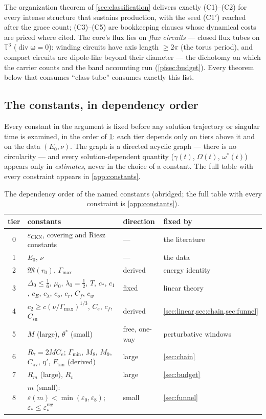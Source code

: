 \documentclass[11pt,letterpaper]{amsart}
\theoremstyle{definition}
\theoremstyle{remark}
\newcommand{\TT}{\mathbb{T}}
\newcommand{\om}{\omega}
\newcommand{\vort}{\boldsymbol{\omega}}
\newcommand{\dive}{\operatorname{div}}
\begin{document}
The organization theorem of \cref{sec:classification} delivers exactly (C1)--(C2)
for every intense structure that sustains production, with the seed (C1$'$)
reached after the grace count; (C3)--(C5) are bookkeeping clauses whose dynamical
costs are priced where cited. The core's flux lies on \emph{flux circuits} ---
closed flux tubes on $\TT^3$ ($\dive\vort=0$): winding circuits have axis length
$\ge2\pi$ (the torus period), and compact circuits are dipole-like beyond their
diameter --- the dichotomy on which the carrier counts and the band accounting
run (\cref{pfsec:budget}). Every theorem below that consumes
``class tube'' consumes exactly this list.

\subsection{The constants, in dependency order}\label{subsec:constants}
Every constant in the argument is fixed before any solution trajectory or singular
time is examined, in the order of \cref{tab:constants}: each tier depends only on
tiers above it and on the data $(E_0,\nu)$. The graph is a directed acyclic graph ---
there is no circularity --- and every solution-dependent quantity
($\gamma(t)$, $\Omega(t)$, $\om^*(t)$) appears only in \emph{estimates}, never in the
choice of a constant. The full table with every constraint appears in
\cref{app:constants}.

\begin{table}[ht]
\centering\small
\begin{tabular}{@{}clll@{}}
\toprule
tier & constants & direction & fixed by \\
\midrule
0 & $\varepsilon_{\mathrm{CKN}}$, covering and Riesz constants & --- & the literature \\
1 & $E_0$, $\nu$ & --- & the data \\
2 & $\mathfrak{M}(r_0)$, $\Gamma_{\max}$ & derived & energy identity \\
3 & $\Delta_0\le\tfrac16$, $\mu_0$, $\lambda_0=\tfrac12$, $T$, $c_*$, $c_1$, $c_E$, $c_\lambda$, $c_o$, $c_r$, $C_f$, $c_w$ & fixed & linear theory \\
4 & $c_2\ge c(\nu/\Gamma_{\max})^{1/3}$, $C_e$, $c_f$, $C_{\mathrm{su}}$ & derived & \cref{sec:linear,sec:chain,sec:funnel} \\
5 & $M$ (large), $\theta^*$ (small) & free, one-way & perturbative windows \\
6 & $R_7=2MC_e$; $\Gamma_{\min}$, $M_8$, $M_9$, $C_{\mathrm{av}}$, $\eta'$,
$F_{\mathrm{tan}}$ (derived) & large & \cref{sec:chain} \\
7 & $R_m$ (large), $R_v$ & large & \cref{sec:budget} \\
8 & $m$ (small): $\varepsilon(m)<\min(\varepsilon_0,\varepsilon_8)$; $\varepsilon_*\le\varepsilon_*^{\mathrm{reg}}$ & small & \cref{sec:funnel} \\
\bottomrule
\end{tabular}
\caption{The dependency order of the named constants (abridged; the full table with
every constraint is \cref{app:constants}).}\label{tab:constants}
\end{table}
\end{document}
